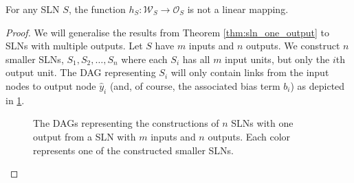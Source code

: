 \begin{corollary}
    \label{col:weight_output_sln}
    For any SLN $S$, the function $h_S: \mathcal{W}_S \rightarrow \mathcal{O}_S$ is not a linear mapping.
\end{corollary}
\begin{proof}
    We will generalise the results from Theorem \ref{thm:sln_one_output} to SLNs with multiple outputs.
    Let $S$ have $m$ inputs and $n$ outputs.
    We construct $n$ smaller SLNs, $S_1,S_2,\dots,S_n$ where each $S_i$ has all $m$ input units, but only the $i$th output unit. 
    The DAG representing $S_i$ will only contain links from the input nodes to output node $\hat{y}_i$ (and, of course, the associated bias term $b_i$) as depicted in \ref{fig:sln_m_in_n_out_construction}.
    \begin{figure}
        \begin{center}
        \end{center}
        \caption{The DAGs representing the constructions of $n$ SLNs with one output from a SLN with $m$ inputs and $n$ outputs. Each color represents one of the constructed smaller SLNs.}
        \label{fig:sln_m_in_n_out_construction}
    \end{figure}
    

\end{proof}
